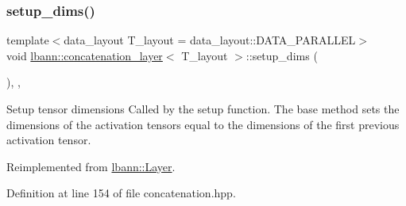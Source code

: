 \mbox{\label{classlbann_1_1concatenation__layer_abc44199934950480dbde30e0b7058a78}} 
\subsubsection{\texorpdfstring{setup\+\_\+dims()}{setup\_dims()}}
{\footnotesize\ttfamily template$<$data\+\_\+layout T\+\_\+layout = data\+\_\+layout\+::\+D\+A\+T\+A\+\_\+\+P\+A\+R\+A\+L\+L\+EL$>$ \\
void \hyperlink{classlbann_1_1concatenation__layer}{lbann\+::concatenation\+\_\+layer}$<$ T\+\_\+layout $>$\+::setup\+\_\+dims (\begin{DoxyParamCaption}{ }\end{DoxyParamCaption})\hspace{0.3cm}{\ttfamily [inline]}, {\ttfamily [override]}, {\ttfamily [virtual]}}

Setup tensor dimensions Called by the setup function. The base method sets the dimensions of the activation tensors equal to the dimensions of the first previous activation tensor. 

Reimplemented from \hyperlink{classlbann_1_1Layer_a90fce1b06c1f2abb480e18cfe08a9746}{lbann\+::\+Layer}.



Definition at line 154 of file concatenation.\+hpp.


